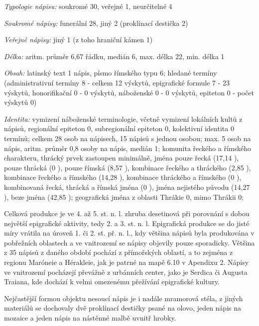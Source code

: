 {\em Typologie nápisu:} soukromé 30, veřejné 1, neurčitelné 4

{\em Soukromé nápisy:} funerální 28, jiný 2 (proklínací destička 2)

{\em Veřejné nápisy:} jiný 1 (z toho hraniční kámen 1)

{\em Délka:} aritm. průměr 6,67 řádku, medián 6, max. délka 22, min. délka 1

{\em Obsah:} latinský text 1 nápis, písmo římského typu 6; hledané termíny (administrativní termíny 8 - celkem 12 výskytů, epigrafické formule 7 - 23 výskytů, honorifikační 0 - 0 výskytů, náboženské 0 - 0 výskytů, epiteton 0 - počet výskytů 0)

{\em Identita:} vymizení náboženské terminologie, včetně vymizení lokálních kultů z nápisů, regionální epiteton 0, subregionální epiteton 0, kolektivní identita 0 termínů; celkem 28 osob na nápisech, 15 nápisů s jednou osobou; max. 5 osob na nápis, aritm. průměr 0,8 osoby na nápis, medián 1; komunita řeckého a římského charakteru, thrácký prvek zastoupen minimálně, jména pouze řecká (17,14 ), pouze thrácká (0 ), pouze římská (8,57 ), kombinace řeckého a thráckého (2,85 ), kombinace řeckého a římského (14,28 ), kombinace thráckého a římského (0 ), kombinovaná řecká, thrácká a římská jména (0 ), jména nejistého původu (14,27 ), beze jména (42,85 ); geografická jména z oblasti Thrákie 0, mimo Thrákii 0;

\NC\AR
\HL
\HL
\stoptable

Celková produkce je ve 4. až 5. st. n. l. zhruba desetinová při porovnání s dobou největší epigrafické aktivity, tedy 2. a 3. st. n. l. Epigrafická produkce se do jisté míry vrátila na úroveň 1. či 2. st. př. n. l., kdy většina nápisů byla produkována v pobřežních oblastech a ve vnitrozemí se nápisy objevily pouze sporadicky. Většina z 35 nápisů z daného období pochází z přímořských oblastí, a to zejména z regionu Maróneie a Hérakleie, jak je patrné na mapě 6.10 v Apendixu 2. Nápisy ve vnitrozemí pocházejí převážně z urbánních center, jako je Serdica či Augusta Traiana, kde dochází k velmi omezenému přežívání epigrafické kultury.

Nejčastější formou objektu nesoucí nápis je i nadále mramorová stéla, z jiných materiálů se dochovaly dvě proklínací destičky psané na olovo, jeden nápis na mozaice a jeden nápis na nástěnné malbě uvnitř hrobky.

